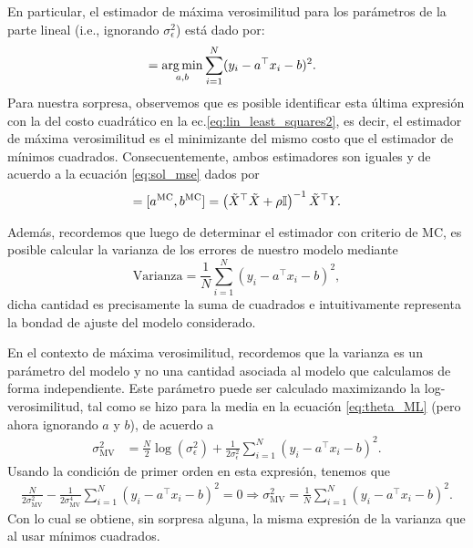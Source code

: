 En particular, el estimador  de máxima verosimilitud para los parámetros de  la parte lineal (i.e., ignorando $\sigma^2_\epsilon$) está dado por:
\begin{align}
	[a^{\text{MV}} ,b^{\text{MV}} ]
						&= \argmin_{a,b} \sum_{i=1}^N (y_i-a^\top x_i - b)^2. \label{eq:theta_ML}
\end{align}
Para  nuestra  sorpresa, observemos que es posible identificar esta última expresión con la del costo cuadrático en la ec.\eqref{eq:lin_least_squares2}, es decir, el estimador de máxima verosimilitud es el minimizante del mismo costo que el estimador de mínimos cuadrados. Consecuentemente, ambos estimadores son iguales y de acuerdo a la ecuación \eqref{eq:sol_mse} dados por 
\begin{equation}
	[a^{\text{MV}} ,b^{\text{MV}} ]=[a^{\text{MC}} ,b^{\text{MC}} ] = \left(\tX^\top\tX +\rho \eye\right)^{-1} \tX^\top Y.
\end{equation}

Además, recordemos que luego de determinar el estimador con criterio de MC, es posible calcular la varianza de los errores de nuestro modelo mediante 
\begin{equation}
	\text{Varianza} = \frac{1}{N}\sum_{i=1}^N (y_i-a^\top x_i -b)^2,
\end{equation}
dicha cantidad es precisamente la suma de cuadrados e intuitivamente representa la bondad de ajuste del modelo considerado. 

En el contexto de máxima verosimilitud, recordemos que la varianza es un parámetro del modelo y no una cantidad asociada al modelo que calculamos de forma independiente. Este parámetro puede ser calculado maximizando la log-verosimilitud, tal como se hizo para la media en la ecuación \eqref{eq:theta_ML} (pero ahora ignorando $a$ y $b$), de acuerdo a
\begin{align}
	\sigma^2_{\text{MV}} &= \frac{N}{2} \log(\sigma_\epsilon^{2}) + \frac{1}{2\sigma_\epsilon^2}\sum_{i=1}^N {(y_i-a^\top x_i -b)^2}. \label{eq:sigma_ML}
\end{align}
Usando la condición de primer orden en esta expresión, tenemos que
\begin{align}
	\frac{N}{2\sigma^2_{\text{MV}}} - \frac{1}{2\sigma^4_{\text{MV}}}\sum_{i=1}^N {(y_i-a^\top x_i -b)^2} = 0 \Rightarrow \sigma^2_{\text{MV}} = \frac{1}{N}\sum_{i=1}^N {(y_i-a^\top x_i -b)^2}.
\end{align}
Con lo cual se obtiene, sin sorpresa alguna, la misma expresión de la varianza que al usar mínimos cuadrados. 

